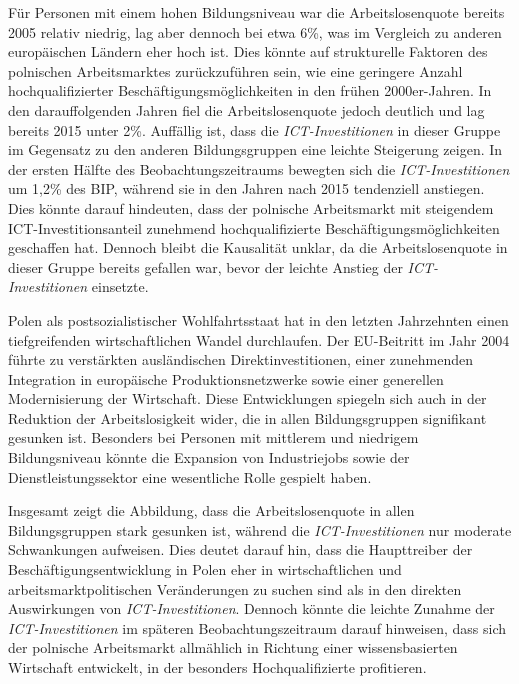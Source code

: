 Für Personen mit einem hohen Bildungsniveau war die Arbeitslosenquote bereits 
2005 relativ niedrig, lag aber dennoch bei etwa 6\%, was im Vergleich zu anderen 
europäischen Ländern eher hoch ist. Dies könnte auf strukturelle Faktoren des 
polnischen Arbeitsmarktes zurückzuführen sein, wie eine geringere Anzahl 
hochqualifizierter Beschäftigungsmöglichkeiten in den frühen 2000er-Jahren. In den 
darauffolgenden Jahren fiel die Arbeitslosenquote jedoch deutlich und lag bereits 
2015 unter 2\%. Auffällig ist, dass die \textit{\ac{ICT}-Investitionen} in dieser 
Gruppe im Gegensatz zu den anderen Bildungsgruppen eine leichte Steigerung zeigen. 
In der ersten Hälfte des Beobachtungszeitraums bewegten sich die 
\textit{\ac{ICT}-Investitionen} um 1,2\% des BIP, während sie in den Jahren nach 
2015 tendenziell anstiegen. Dies könnte darauf hindeuten, dass der polnische 
Arbeitsmarkt mit steigendem ICT-Investitionsanteil zunehmend hochqualifizierte 
Beschäftigungsmöglichkeiten geschaffen hat. Dennoch bleibt die Kausalität unklar, 
da die Arbeitslosenquote in dieser Gruppe bereits gefallen war, bevor der leichte 
Anstieg der \textit{\ac{ICT}-Investitionen} einsetzte.

Polen als postsozialistischer Wohlfahrtsstaat hat in den letzten Jahrzehnten einen 
tiefgreifenden wirtschaftlichen Wandel durchlaufen. Der EU-Beitritt im Jahr 2004 
führte zu verstärkten ausländischen Direktinvestitionen, einer zunehmenden 
Integration in europäische Produktionsnetzwerke sowie einer generellen 
Modernisierung der Wirtschaft. Diese Entwicklungen spiegeln sich auch in der 
Reduktion der Arbeitslosigkeit wider, die in allen Bildungsgruppen signifikant 
gesunken ist. Besonders bei Personen mit mittlerem und niedrigem Bildungsniveau 
könnte die Expansion von Industriejobs sowie der Dienstleistungssektor eine 
wesentliche Rolle gespielt haben. %

Insgesamt zeigt die Abbildung, dass die Arbeitslosenquote in allen Bildungsgruppen 
stark gesunken ist, während die \textit{\ac{ICT}-Investitionen} nur moderate 
Schwankungen aufweisen. Dies deutet darauf hin, dass die Haupttreiber der 
Beschäftigungsentwicklung in Polen eher in wirtschaftlichen und 
arbeitsmarktpolitischen Veränderungen zu suchen sind als in den direkten 
Auswirkungen von \textit{\ac{ICT}-Investitionen}. Dennoch könnte die leichte 
Zunahme der \textit{\ac{ICT}-Investitionen} im späteren Beobachtungszeitraum 
darauf hinweisen, dass sich der polnische Arbeitsmarkt allmählich in Richtung 
einer wissensbasierten Wirtschaft entwickelt, in der besonders Hochqualifizierte 
profitieren.

